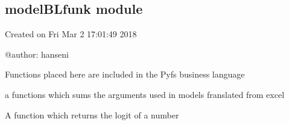\documentclass[letterpaper,10pt,english]{sphinxmanual}
\begin{document}

\begin{fulllineitems}
\label{\detokenize{core/modelpattern:modelpattern.f2}}
\pysigstartsignatures
{}
\pysigstopsignatures
\end{fulllineitems}


\sphinxstepscope


\subsection{modelBLfunk module}
\label{\detokenize{core/modelBLfunk:module-modelBLfunk}}\label{\detokenize{core/modelBLfunk:modelblfunk-module}}\label{\detokenize{core/modelBLfunk::doc}}
\sphinxAtStartPar
Created on Fri Mar  2 17:01:49 2018

\sphinxAtStartPar
@author: hanseni

\sphinxAtStartPar
Functions placed here are included in the Pyfs business language

\begin{fulllineitems}
\label{\detokenize{core/modelBLfunk:modelBLfunk.sum_excel}}
\pysigstartsignatures
{}
\pysigstopsignatures
\sphinxAtStartPar
a functions which sums the arguments used in models franslated from excel

\end{fulllineitems}


\begin{fulllineitems}
\label{\detokenize{core/modelBLfunk:modelBLfunk.logit}}
\pysigstartsignatures
{}
\pysigstopsignatures
\sphinxAtStartPar
A function which returns the logit of a number

\end{fulllineitems}
\end{document}

